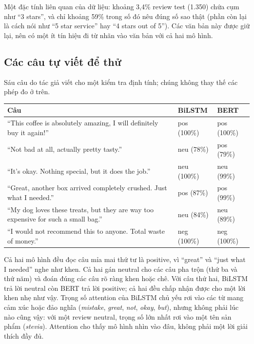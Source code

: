 Một đặc tính liên quan của dữ liệu: khoảng 3,4\% review test (1.350) chứa cụm như ``3 stars'', và chỉ khoảng 59\% trong số đó nêu đúng số sao thật (phần còn lại là cách nói như ``5 star service'' hay ``4 stars out of 5''). Các văn bản này được giữ lại, nên có một ít tín hiệu đi từ nhãn vào văn bản với cả hai mô hình.

\subsection*{Các câu tự viết để thử}

Sáu câu do tác giả viết cho một kiểm tra định tính; chúng không thay thế các phép đo ở trên.

\begin{center}
\small
\begin{tabular}{@{}p{7.2cm}ll@{}}
    \toprule
    Câu & BiLSTM & BERT \\
    \midrule
    ``This coffee is absolutely amazing, I will definitely buy it again!'' & pos (100\%) & pos (100\%) \\
    ``Not bad at all, actually pretty tasty.'' & neu (78\%) & pos (79\%) \\
    ``It's okay. Nothing special, but it does the job.'' & neu (100\%) & neu (99\%) \\
    ``Great, another box arrived completely crushed. Just what I needed.'' & pos (87\%) & pos (99\%) \\
    ``My dog loves these treats, but they are way too expensive for such a small bag.'' & neu (84\%) & neu (89\%) \\
    ``I would not recommend this to anyone. Total waste of money.'' & neg (100\%) & neg (100\%) \\
    \bottomrule
\end{tabular}
\end{center}

Cả hai mô hình đều đọc câu mỉa mai thứ tư là positive, vì ``great'' và ``just what I needed'' nghe như khen. Cả hai gán neutral cho các câu pha trộn (thứ ba và thứ năm) và đoán đúng các câu rõ ràng khen hoặc chê. Với câu thứ hai, BiLSTM trả lời neutral còn BERT trả lời positive; cả hai đều chấp nhận được cho một lời khen nhẹ như vậy. Trọng số attention của BiLSTM chủ yếu rơi vào các từ mang cảm xúc hoặc đảo nghĩa (\emph{mistake}, \emph{great}, \emph{not}, \emph{okay}, \emph{but}), nhưng không phải lúc nào cũng vậy: với một review neutral, trọng số lớn nhất rơi vào một tên sản phẩm (\emph{stevia}). Attention cho thấy mô hình nhìn vào đâu, không phải một lời giải thích đầy đủ.

